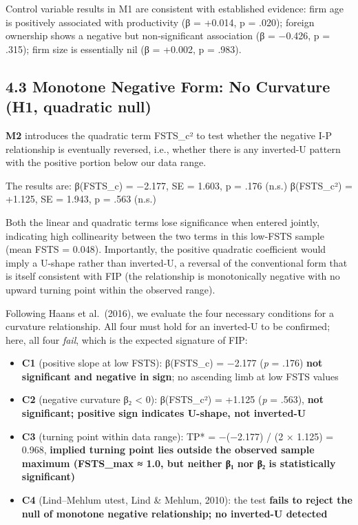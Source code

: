 \documentclass[
  12pt]{article}
\providecommand{\tightlist}{%
  \setlength{\itemsep}{0pt}\setlength{\parskip}{0pt}}
\begin{document}
Control variable results in M1 are consistent with established evidence:
firm age is positively associated with productivity (β = +0.014, p =
.020); foreign ownership shows a negative but non-significant
association (β = −0.426, p = .315); firm size is essentially nil (β =
+0.002, p = .983).

\hypertarget{monotone-negative-form-no-curvature-h1-quadratic-null}{%
\subsection{4.3 Monotone Negative Form: No Curvature (H1, quadratic
null)}\label{monotone-negative-form-no-curvature-h1-quadratic-null}}

\textbf{M2} introduces the quadratic term FSTS\_c² to test whether the
negative I-P relationship is eventually reversed, i.e., whether there is
any inverted-U pattern with the positive portion below our data range.

The results are: β(FSTS\_c) = −2.177, SE = 1.603, p = .176 (n.s.)
β(FSTS\_c²) = +1.125, SE = 1.943, p = .563 (n.s.)

Both the linear and quadratic terms lose significance when entered
jointly, indicating high collinearity between the two terms in this
low-FSTS sample (mean FSTS = 0.048). Importantly, the positive quadratic
coefficient would imply a U-shape rather than inverted-U, a reversal of
the conventional form that is itself consistent with FIP (the
relationship is monotonically negative with no upward turning point
within the observed range).

Following Haans et al.~(2016), we evaluate the four necessary conditions
for a curvature relationship. All four must hold for an inverted-U to be
confirmed; here, all four \emph{fail}, which is the expected signature
of FIP:

\begin{itemize}
\tightlist
\item
  \textbf{C1} (positive slope at low FSTS): β(FSTS\_c) = −2.177
  (\emph{p} = .176) \textbf{not significant and negative in sign}; no
  ascending limb at low FSTS values
\item
  \textbf{C2} (negative curvature β₂ \textless{} 0): β(FSTS\_c²) =
  +1.125 (\emph{p} = .563), \textbf{not significant; positive sign
  indicates U-shape, not inverted-U}
\item
  \textbf{C3} (turning point within data range): TP* = −(−2.177) / (2 ×
  1.125) = 0.968, \textbf{implied turning point lies outside the
  observed sample maximum (FSTS\_max ≈ 1.0, but neither β₁ nor β₂ is
  statistically significant)}
\item
  \textbf{C4} (Lind--Mehlum utest, Lind \& Mehlum, 2010): the test
  \textbf{fails to reject the null of monotone negative relationship; no
  inverted-U detected}
\end{itemize}
\end{document}
